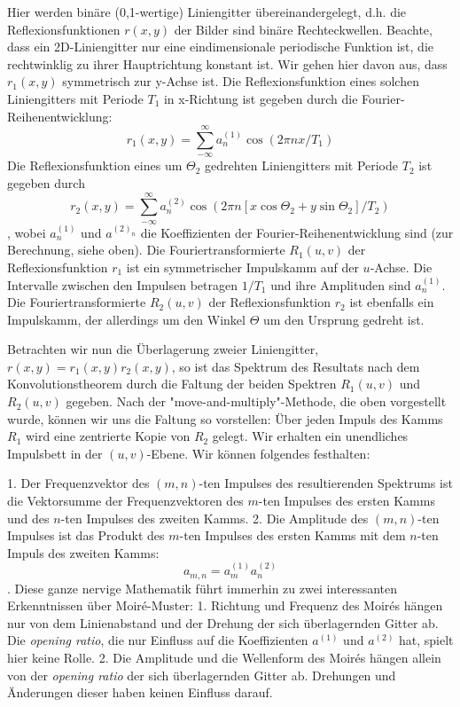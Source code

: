\documentclass[a4paper]{article}
\begin{document}
Hier werden binäre (0,1-wertige) Liniengitter übereinandergelegt, d.h. die Reflexionsfunktionen $r(x,y)$ der Bilder sind binäre Rechteckwellen. Beachte, dass ein 2D-Liniengitter nur eine eindimensionale periodische Funktion ist, die rechtwinklig zu ihrer Hauptrichtung konstant ist.
Wir gehen hier davon aus, dass $r_1(x,y)$ symmetrisch zur y-Achse ist. Die Reflexionsfunktion eines solchen Liniengitters mit Periode $T_1$ in x-Richtung ist gegeben durch die Fourier-Reihenentwicklung:
$$r_1(x,y)=\sum\limits_{-\infty}^{\infty}a^{(1)}_n\cos(2\pi nx/T_1)$$
Die Reflexionsfunktion eines um $\Theta_2$ gedrehten Liniengitters mit Periode $T_2$ ist gegeben durch
$$r_2(x,y)=\sum\limits_{-\infty}^{\infty}a^{(2)}_n\cos(2 \pi n[x\cos \Theta_2 + y \sin \Theta_2]/T_2)$$,
wobei $a^{(1)}_n$ und $a^{(2)_n}$ die Koeffizienten der Fourier-Reihenentwicklung sind (zur Berechnung, siehe oben).
Die Fouriertransformierte $R_1(u,v)$ der Reflexionsfunktion $r_1$ ist ein symmetrischer Impulskamm auf der $u$-Achse. Die Intervalle zwischen den Impulsen betragen $1/T_1$ und ihre Amplituden sind $a^{(1)}_n$. Die Fouriertransformierte $R_2(u,v)$ der Reflexionsfunktion $r_2$ ist ebenfalls ein Impulskamm, der allerdings um den Winkel $\Theta$ um den Ursprung gedreht ist.

Betrachten wir nun die Überlagerung zweier Liniengitter, $r(x,y)=r_1(x,y)r_2(x,y)$, so ist das Spektrum des Resultats nach dem Konvolutionstheorem durch die Faltung der beiden Spektren $R_1(u,v)$ und $R_2(u,v)$ gegeben. Nach der "move-and-multiply"-Methode, die oben vorgestellt wurde, können wir uns die Faltung so vorstellen: Über jeden Impuls des Kamms $R_1$ wird eine zentrierte Kopie von $R_2$ gelegt. Wir erhalten ein unendliches Impulsbett in der $(u,v)$-Ebene.
Wir können folgendes festhalten:

1. Der Frequenzvektor des $(m,n)$-ten Impulses des resultierenden Spektrums ist die Vektorsumme der Frequenzvektoren des $m$-ten Impulses des ersten Kamms und des $n$-ten Impulses des zweiten Kamms.
2. Die Amplitude des $(m,n)$-ten Impulses ist das Produkt des $m$-ten Impulses des ersten Kamms mit dem $n$-ten Impuls des zweiten Kamms:
$$a_{m,n}=a^{(1)}_ma^{(2)}_n$$.
Diese ganze nervige Mathematik führt immerhin zu zwei interessanten Erkenntnissen über Moiré-Muster:
1. Richtung und Frequenz des Moirés hängen nur von dem Linienabstand und der Drehung der sich überlagernden Gitter ab. Die \textit{opening ratio}, die nur Einfluss auf die Koeffizienten $a^{(1)}$ und $a^{(2)}$ hat, spielt hier keine Rolle.
2. Die Amplitude und die Wellenform des Moirés hängen allein von der \textit{opening ratio} der sich überlagernden Gitter ab. Drehungen und Änderungen dieser haben keinen Einfluss darauf.
\end{document}

